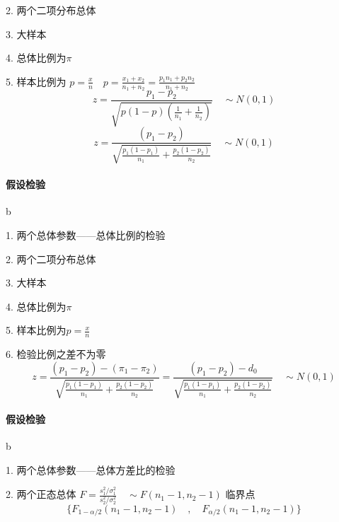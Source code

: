 \documentclass[UTF8,10pt]{book}
\begin{document}
    2. 两个二项分布总体 
    
    3. 大样本 
    
    4. 总体比例为$\pi$ 
    
    5. 样本比例为
    $p = \frac{x}{n} \quad p = \frac{x_1 +x_2}{n_1 + n_2}=\frac{p_1 n_1+p_2 n_2}{n_1 + n_2}$ 
    $$ z = \frac{p_1 - p_2}{\sqrt{p(1-p)(\frac{1}{n_1}+\frac{1}{n_2})}} \quad \sim N(0,1)$$ $$ z = \frac{(p_1-p_2)}{\sqrt{\frac{p_1(1-p_1)}{n_1} + \frac{p_2(1-p_2)}{n_2} }} \quad \sim N(0,1)$$
    
    \paragraph{假设检验} b
    
    1. 两个总体参数——总体比例的检验 
    
    2. 两个二项分布总体 
    
    3. 大样本 
    
    4. 总体比例为$\pi$ 
    
    5. 样本比例为$p = \frac{x}{n}$ 
    
    6. 检验比例之差不为零	
    $$ z = \frac{(p_1-p_2)-(\pi_1-\pi_2)}{\sqrt{\frac{p_1(1-p_1)}{n_1} + \frac{p_2(1-p_2)}{n_2} }} = \frac{(p_1-p_2)-d_0}{\sqrt{\frac{p_1(1-p_1)}{n_1} + \frac{p_2(1-p_2)}{n_2} }} \quad \sim N(0,1)$$
    
    \paragraph{假设检验} b
    
    1. 两个总体参数——总体方差比的检验 
    
    2. 两个正态总体	
    $F = \frac{s_1^2 / \sigma_1^2}{s_2^2 / \sigma_2^2} \quad \sim F(n_1-1,n_2-1)$ 
    临界点 $$ \{F_{1-\alpha / 2}(n_1-1,n_2-1) \quad , \quad F_{\alpha / 2}(n_1-1,n_2-1) \}$$
\end{document}
